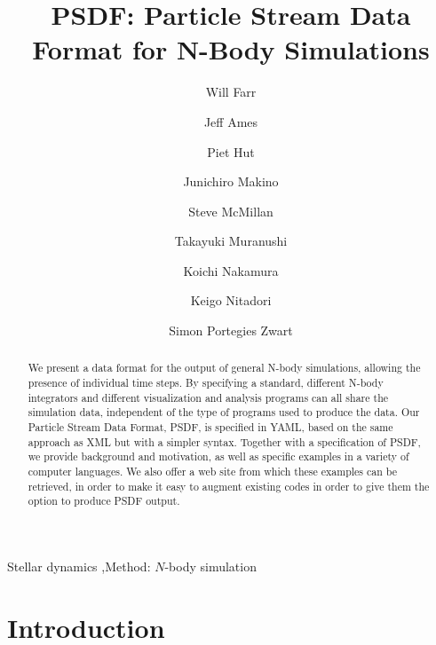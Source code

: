 \documentclass[5p,authoryear]{elsarticle}
\begin{document}
\title{PSDF: Particle Stream Data Format for N-Body Simulations}

\author[WMF]{Will Farr}
\author[JA]{Jeff Ames}
\author[PH]{Piet Hut}
\author[JM]{Junichiro Makino}
\author[SM]{Steve McMillan}
\author[TM]{Takayuki Muranushi}
\author[KN]{Koichi Nakamura}
\author[KN2]{Keigo Nitadori}
\author[SPZ]{Simon Portegies Zwart}


\address[WMF]{Northwestern University Center for Interdisciplinary
  Research in Astrophysics, 2145 Sheridan Rd., Evanston IL 60208}

\address[JM]{Interactive Research Center of Science, Graduate
  School of Science and Engineering Tokyo Institute of Technology,
  2--12--1 Ookayama, Meguro, Tokyo 152-8551, Japan}

\address[PH]{Institute
  for Advanced Study, Princeton, NJ 08540, USA}

\begin{abstract}
  We present a data format for the output of general N-body simulations,
  allowing the presence of individual time steps.  By specifying a standard,
  different N-body integrators and different visualization and analysis
  programs can all share the simulation data, independent of the type of
  programs used to produce the data.  Our Particle Stream Data Format,
  PSDF, is specified in YAML, based on the same approach as XML but
  with a simpler syntax.  Together with a specification of PSDF, we
  provide background and motivation, as well as specific examples in a
  variety of computer languages.  We also offer a web site from which
  these examples can be retrieved, in order to make it easy to augment
  existing codes in order to give them the option to produce PSDF output.
\end{abstract}

\begin{keyword}
Stellar dynamics \sep Method: $N$-body simulation
\end{keyword}

\maketitle

\section{Introduction}
\end{document}
